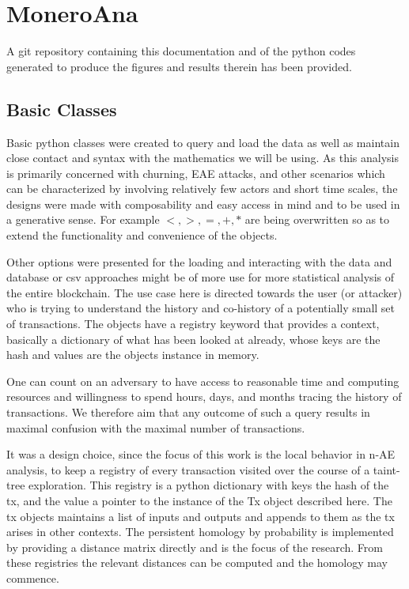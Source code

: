 \section{MoneroAna}

A git repository containing this documentation and of the python codes generated to produce the figures and results therein has been provided.

\subsection{Basic Classes}  

Basic python classes were created to query and load the data as well as maintain close contact and syntax with the mathematics we will be using.  As this analysis is primarily concerned with churning, EAE attacks, and other scenarios which can be characterized by involving relatively few actors and short time scales, the designs were made with composability and easy access in mind and to be used in a generative sense.  For example $<, >, = , +, *$ are being overwritten so as to extend the functionality and convenience of the objects.  

Other options were presented for the loading and interacting with the data and database or csv approaches might be of more use for more statistical analysis of the entire blockchain.  The use case here is directed towards the user (or attacker) who is trying to understand the history and co-history of a potentially small set of transactions.  The objects have a registry keyword that provides a context, basically a dictionary of what has been looked at already, whose keys are the hash and values are the objects instance in memory.

One can count on an adversary to have access to reasonable time and computing resources and willingness to spend hours, days, and months tracing the history of transactions.  
We therefore aim that any outcome of such a query results in maximal confusion with the maximal number of transactions.

It was a design choice, since the focus of this work is the local behavior in n-AE analysis, to keep a registry of every transaction visited over the course of a taint-tree exploration.  
This registry is a python dictionary with keys the hash of the tx, and the value a pointer to the instance of the Tx object described here.
The tx objects maintains a list of inputs and outputs and appends to them as the tx arises in other contexts.  
The persistent homology by probability is implemented by providing a distance matrix directly and is the focus of the research.
From these registries the relevant distances can be computed and the homology may commence.

